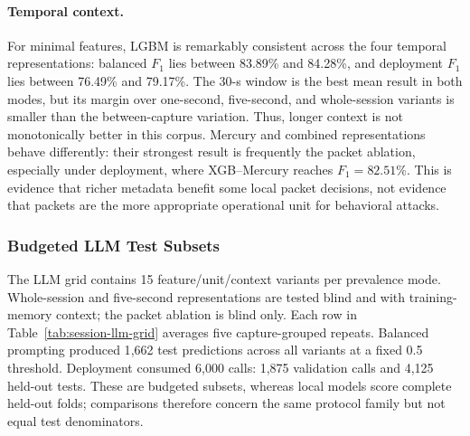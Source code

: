 \documentclass[letterpaper,twocolumn,10pt]{article}
\begin{document}
\paragraph{Temporal context.}
For minimal features, LGBM is remarkably consistent across the four temporal representations: balanced $F_1$ lies between 83.89\% and 84.28\%, and deployment $F_1$ lies between 76.49\% and 79.17\%. The 30-s window is the best mean result in both modes, but its margin over one-second, five-second, and whole-session variants is smaller than the between-capture variation. Thus, longer context is not monotonically better in this corpus. Mercury and combined representations behave differently: their strongest result is frequently the packet ablation, especially under deployment, where XGB--Mercury reaches $F_1=82.51\%$. This is evidence that richer metadata benefit some local packet decisions, not evidence that packets are the more appropriate operational unit for behavioral attacks.

\subsubsection{Budgeted LLM Test Subsets}

The LLM grid contains 15 feature/unit/context variants per prevalence mode. Whole-session and five-second representations are tested blind and with training-memory context; the packet ablation is blind only. Each row in Table~\ref{tab:session-llm-grid} averages five capture-grouped repeats. Balanced prompting produced 1{,}662 test predictions across all variants at a fixed 0.5 threshold. Deployment consumed 6{,}000 calls: 1{,}875 validation calls and 4{,}125 held-out tests. These are budgeted subsets, whereas local models score complete held-out folds; comparisons therefore concern the same protocol family but not equal test denominators.
\end{document}
